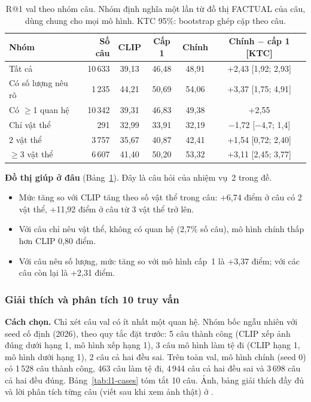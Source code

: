 \begin{table}[t]
\centering
\caption{R@1 val theo nhóm câu. Nhóm định nghĩa một lần từ đồ thị FACTUAL của câu, dùng chung cho mọi mô hình. KTC 95\%:
bootstrap ghép cặp theo câu.}
\label{tab:l1-groups}
\footnotesize
\setlength{\tabcolsep}{2pt}
\begin{tabular}{lrcccc}
\toprule
Nhóm & Số câu & CLIP & Cấp 1 & Chính & Chính $-$ cấp 1 [KTC] \\
\midrule
Tất cả & 10\,633 & 39,13 & 46,48 & 48,91 & +2,43 [1,92; 2,93] \\
Có số lượng nêu rõ & 1\,235 & 44,21 & 50,69 & 54,06 & +3,37 [1,75; 4,91] \\
Có $\ge$1 quan hệ & 10\,342 & 39,31 & 46,83 & 49,38 & +2,55 \\
Chỉ vật thể & 291 & 32,99 & 33,91 & 32,19 & $-$1,72 [$-$4,7; 1,4] \\
2 vật thể & 3\,757 & 35,67 & 40,87 & 42,41 & +1,54 [0,72; 2,40] \\
$\ge$3 vật thể & 6\,607 & 41,40 & 50,20 & 53,32 & +3,11 [2,45; 3,77] \\
\bottomrule
\end{tabular}
\end{table}

\textbf{Đồ thị giúp ở đâu} (Bảng~\ref{tab:l1-groups}). Đây là câu hỏi của nhiệm vụ~2 trong đề.
\begin{itemize}
\item Mức tăng so với CLIP tăng theo số vật thể trong câu: +6,74 điểm ở câu có 2 vật thể, +11,92 điểm ở câu từ 3 vật thể
trở lên.
\item Với câu chỉ nêu vật thể, không có quan hệ (2,7\% số câu), mô hình chính thấp hơn CLIP 0,80 điểm.
\item Với câu nêu số lượng, mức tăng so với mô hình cấp~1 là +3,37 điểm; với các câu còn lại là +2,31 điểm.
\end{itemize}

\subsubsection{Giải thích và phân tích 10 truy vấn}\label{sec:l1-cases}
\textbf{Cách chọn.} Chỉ xét câu val có ít nhất một quan hệ. Nhóm bốc ngẫu nhiên với seed cố định (2026), theo quy tắc đặt
trước: 5 câu thành công (CLIP xếp ảnh đúng dưới hạng 1, mô hình xếp hạng 1), 3 câu mô hình làm tệ đi (CLIP hạng 1, mô hình
dưới hạng 1), 2 câu cả hai đều sai. Trên toàn val, mô hình chính (seed 0) có 1\,528 câu thành công, 463 câu làm tệ đi,
4\,944 câu cả hai đều sai và 3\,698 câu cả hai đều đúng. Bảng~\ref{tab:l1-cases} tóm tắt 10 câu. Ảnh, bảng giải thích đầy
đủ và lời phân tích từng câu (viết sau khi xem ảnh thật) ở .

